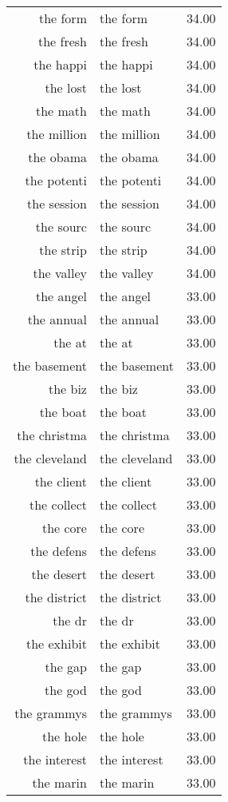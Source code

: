 \begin{table}[ht]
\begin{tabular}{rlr}
  the form & the form & 34.00 \\ 
  the fresh & the fresh & 34.00 \\ 
  the happi & the happi & 34.00 \\ 
  the lost & the lost & 34.00 \\ 
  the math & the math & 34.00 \\ 
  the million & the million & 34.00 \\ 
  the obama & the obama & 34.00 \\ 
  the potenti & the potenti & 34.00 \\ 
  the session & the session & 34.00 \\ 
  the sourc & the sourc & 34.00 \\ 
  the strip & the strip & 34.00 \\ 
  the valley & the valley & 34.00 \\ 
  the angel & the angel & 33.00 \\ 
  the annual & the annual & 33.00 \\ 
  the at & the at & 33.00 \\ 
  the basement & the basement & 33.00 \\ 
  the biz & the biz & 33.00 \\ 
  the boat & the boat & 33.00 \\ 
  the christma & the christma & 33.00 \\ 
  the cleveland & the cleveland & 33.00 \\ 
  the client & the client & 33.00 \\ 
  the collect & the collect & 33.00 \\ 
  the core & the core & 33.00 \\ 
  the defens & the defens & 33.00 \\ 
  the desert & the desert & 33.00 \\ 
  the district & the district & 33.00 \\ 
  the dr & the dr & 33.00 \\ 
  the exhibit & the exhibit & 33.00 \\ 
  the gap & the gap & 33.00 \\ 
  the god & the god & 33.00 \\ 
  the grammys & the grammys & 33.00 \\ 
  the hole & the hole & 33.00 \\ 
  the interest & the interest & 33.00 \\ 
  the marin & the marin & 33.00 \\ 

\end{tabular}
\end{table}
